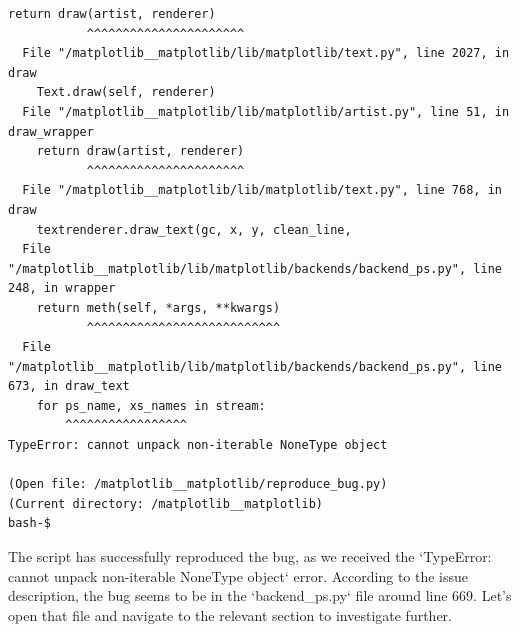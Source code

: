 {\begin{observationbox}
\begin{Verbatim}[breaklines=true, breakanywhere=true]
    return draw(artist, renderer)
           ^^^^^^^^^^^^^^^^^^^^^^
  File "/matplotlib__matplotlib/lib/matplotlib/text.py", line 2027, in draw
    Text.draw(self, renderer)
  File "/matplotlib__matplotlib/lib/matplotlib/artist.py", line 51, in draw_wrapper
    return draw(artist, renderer)
           ^^^^^^^^^^^^^^^^^^^^^^
  File "/matplotlib__matplotlib/lib/matplotlib/text.py", line 768, in draw
    textrenderer.draw_text(gc, x, y, clean_line,
  File "/matplotlib__matplotlib/lib/matplotlib/backends/backend_ps.py", line 248, in wrapper
    return meth(self, *args, **kwargs)
           ^^^^^^^^^^^^^^^^^^^^^^^^^^^
  File "/matplotlib__matplotlib/lib/matplotlib/backends/backend_ps.py", line 673, in draw_text
    for ps_name, xs_names in stream:
        ^^^^^^^^^^^^^^^^^
TypeError: cannot unpack non-iterable NoneType object

(Open file: /matplotlib__matplotlib/reproduce_bug.py)
(Current directory: /matplotlib__matplotlib)
bash-$
\end{Verbatim}
\end{observationbox}
\begin{agentbox}
The script has successfully reproduced the bug, as we received the `TypeError: cannot unpack non-iterable NoneType object` error. According to the issue description, the bug seems to be in the `backend\_ps.py` file around line 669. Let's open that file and navigate to the relevant section to investigate further.


\end{agentbox}}
